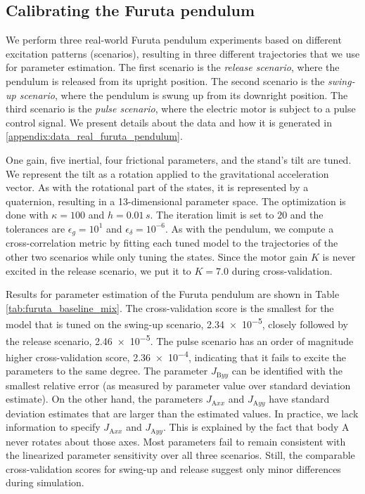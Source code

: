 \documentclass[preprint,12pt]{elsarticle}
\numberwithin{equation}{section}
\def\tA{\text{A}}
\def\tB{\text{B}}
\begin{document}
\subsection{Calibrating the Furuta pendulum}
We perform three real-world Furuta pendulum experiments based on different excitation patterns (scenarios), resulting in three different trajectories that we use for parameter estimation.
The first scenario is the \emph{release scenario}, where the pendulum is released from its upright position.
The second scenario is the \emph{swing-up scenario}, where the pendulum is swung up from its downright position.
The third scenario is the \emph{pulse scenario}, where the electric motor is subject to a pulse control signal.
We present details about the data and how it is generated in \ref{appendix:data_real_furuta_pendulum}.

One gain, five inertial, four frictional parameters, and the stand's tilt are tuned.
We represent the tilt as a rotation applied to the gravitational acceleration vector.
As with the rotational part of the states, it is represented by a quaternion, resulting in a 13-dimensional parameter space.
The optimization is done with $\kappa = 100$ and $h = 0.01\,\si{s}$.
The iteration limit is set to $20$ and the tolerances are $\epsilon_g = 10^{1}$ and $\epsilon_\delta = 10^{-6}$.
As with the pendulum, we compute a cross-correlation metric by fitting each tuned model to the trajectories of the other two scenarios while only tuning the states.
Since the motor gain $K$ is never excited in the release scenario, we put it to $K = 7.0$ during cross-validation.

Results for parameter estimation of the Furuta pendulum are shown in Table \ref{tab:furuta_baseline_mix}.
The cross-validation score is the smallest for the model that is tuned on the swing-up scenario, \SI{2.34e-5}{}, closely followed by the release scenario, \SI{2.46e-5}{}.
The pulse scenario has an order of magnitude higher cross-validation score, \SI{2.36e-4}{}, indicating that it fails to excite the parameters to the same degree.
The parameter $J_{\tB yy}$ can be identified with the smallest relative error (as measured by parameter value over standard deviation estimate).
On the other hand, the parameters $J_{\tA xx}$ and $J_{\tA yy}$ have standard deviation estimates that are larger than the estimated values.
In practice, we lack information to specify $J_{\tA xx}$ and $J_{\tA yy}$.
This is explained by the fact that body $\tA$ never rotates about those axes.
Most parameters fail to remain consistent with the linearized parameter sensitivity over all three scenarios.
Still, the comparable cross-validation scores for swing-up and release suggest only minor differences during simulation.
\end{document}
